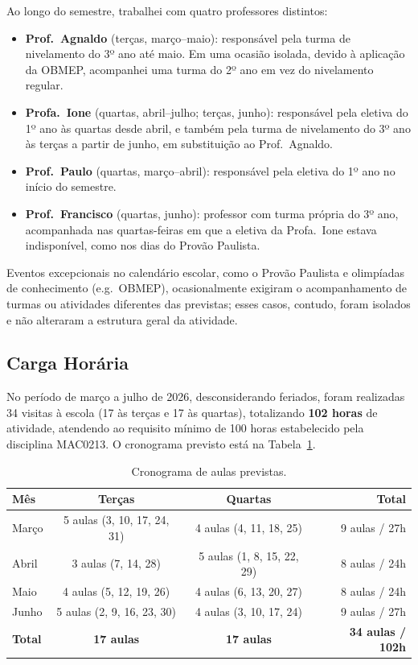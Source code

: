 \documentclass[11pt]{article}
\begin{document}
Ao longo do semestre, trabalhei com quatro professores distintos:

\begin{itemize}
	\item \textbf{Prof.\ Agnaldo} (terças, março--maio): responsável pela turma de nivelamento do 3º ano até maio. Em uma ocasião isolada, devido à aplicação da OBMEP, acompanhei uma turma do 2º ano em vez do nivelamento regular.
	\item \textbf{Profa.\ Ione} (quartas, abril--julho; terças, junho): responsável pela eletiva do 1º ano às quartas desde abril, e também pela turma de nivelamento do 3º ano às terças a partir de junho, em substituição ao Prof.\ Agnaldo.
	\item \textbf{Prof.\ Paulo} (quartas, março--abril): responsável pela eletiva do 1º ano no início do semestre.
	\item \textbf{Prof.\ Francisco} (quartas, junho): professor com turma própria do 3º ano, acompanhada nas quartas-feiras em que a eletiva da Profa.\ Ione estava indisponível, como nos dias do Provão Paulista.
\end{itemize}

Eventos excepcionais no calendário escolar, como o Provão Paulista e olimpíadas de conhecimento (e.g.\ OBMEP), ocasionalmente exigiram o acompanhamento de turmas ou atividades diferentes das previstas; esses casos, contudo, foram isolados e não alteraram a estrutura geral da atividade.

\subsection{Carga Horária}

No período de março a julho de 2026, desconsiderando feriados, foram realizadas 34 visitas à escola (17 às terças e 17 às quartas), totalizando \textbf{102 horas} de atividade, atendendo ao requisito mínimo de 100 horas estabelecido pela disciplina MAC0213. O cronograma previsto está na Tabela~\ref{tab:cronograma}.

\begin{table}[h]
\centering
\begin{tabular}{lccr}
\toprule
\textbf{Mês} & \textbf{Terças} & \textbf{Quartas} & \textbf{Total} \\
\midrule
Março & 5 aulas (3, 10, 17, 24, 31) & 4 aulas (4, 11, 18, 25) & 9 aulas / 27h \\
Abril & 3 aulas (7, 14, 28) & 5 aulas (1, 8, 15, 22, 29) & 8 aulas / 24h \\
Maio  & 4 aulas (5, 12, 19, 26) & 4 aulas (6, 13, 20, 27) & 8 aulas / 24h \\
Junho & 5 aulas (2, 9, 16, 23, 30) & 4 aulas (3, 10, 17, 24) & 9 aulas / 27h \\
\midrule
\textbf{Total} & \textbf{17 aulas} & \textbf{17 aulas} & \textbf{34 aulas / 102h} \\
\bottomrule
\end{tabular}
\caption{Cronograma de aulas previstas.}
\label{tab:cronograma}
\end{table}
\end{document}
